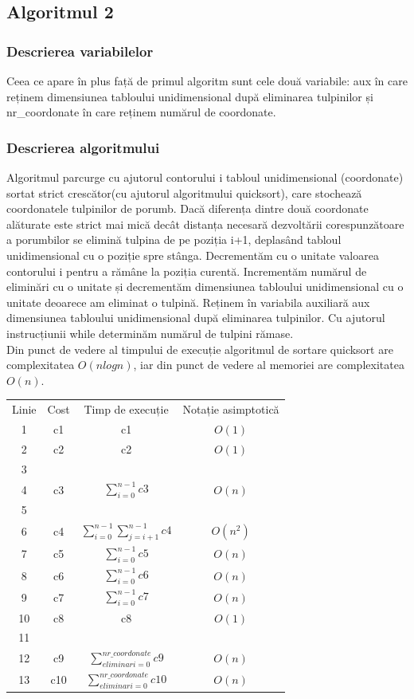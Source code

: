 \documentclass[11pt,a4paper]{article}
\begin{document}
\subsection{Algoritmul 2}
    \subsubsection{\large Descrierea variabilelor}
    Ceea ce apare în plus față de primul algoritm sunt cele două variabile: aux în care reținem dimensiunea tabloului unidimensional după eliminarea tulpinilor și nr\_coordonate în care reținem numărul de coordonate.
     
    \subsubsection{\large Descrierea algoritmului} 
    Algoritmul parcurge cu ajutorul contorului i tabloul unidimensional (coordonate) sortat strict crescător(cu ajutorul algoritmului quicksort), care stochează coordonatele tulpinilor de porumb. Dacă diferența dintre două coordonate alăturate este strict mai mică decât distanța necesară dezvoltării corespunzătoare a porumbilor se elimină tulpina de pe poziția i+1, deplasând tabloul unidimensional cu o poziție spre stânga. Decrementăm cu o unitate valoarea contorului i pentru a rămâne la poziția curentă. Incrementăm numărul de eliminări cu o unitate și decrementăm dimensiunea tabloului unidimensional cu o unitate deoarece am eliminat o tulpină. Reținem în variabila auxiliară aux dimensiunea tabloului unidimensional după eliminarea tulpinilor. Cu ajutorul instrucțiunii while determinăm numărul de tulpini rămase. \\
\vspace{0,4mm}
    Din punct de vedere al timpului de execuție algoritmul de sortare quicksort are complexitatea $O(n log n)$, iar din punct de vedere al memoriei are complexitatea $O(n)$.
  
\begin{center}
\begin{tabular}{ c c c c}
 Linie & Cost & Timp de execuție  & Notație asimptotică  \\ 
 1 & c1 & c1 & $O(1)$ \\
 2 & c2 & c2 & $O(1)$ \\
 3 \\
 4 & c3 & $\sum\limits_{i=0}^{n-1}c3$ & $O(n)$ \\
 5 \\
 6 & c4 & $\sum\limits_{i=0}^{n-1}\sum\limits_{j=i+1}^{n-1}c4$ & $O(n^2)$ \\
 7 & c5 & $\sum\limits_{i=0}^{n-1}c5$ & $O(n)$ \\
 8 & c6 & $\sum\limits_{i=0}^{n-1}c6$ & $O(n)$ \\
 9 & c7 & $\sum\limits_{i=0}^{n-1}c7$ & $O(n)$ \\
 10 & c8 & c8 & $O(1)$ \\
 11 \\ 
 12 & c9 & $\sum\limits_{eliminari=0}^{nr\_coordonate}c9$ & $O(n)$ \\
 13 & c10 & $\sum\limits_{eliminari=0}^{nr\_coordonate}c10$ & $O(n)$ 
\end{tabular}
\end{center}
    
\end{document}
